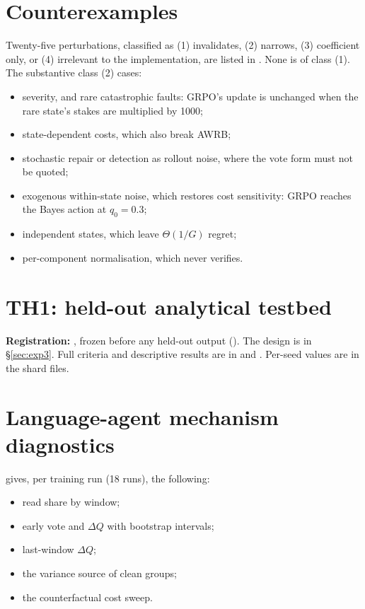 \section{Counterexamples}\label{app3:counter}
Twenty-five perturbations, classified as (1) invalidates, (2) narrows, (3) coefficient only, or (4) irrelevant to the
implementation, are listed in . None is of class (1). The substantive class (2)
cases:
\begin{itemize}
\item severity, and rare catastrophic faults: GRPO's update is unchanged when the rare state's stakes are multiplied
by 1000;
\item state-dependent costs, which also break AWRB;
\item stochastic repair or detection as rollout noise, where the vote form must not be quoted;
\item exogenous within-state noise, which restores cost sensitivity: GRPO reaches the Bayes action at $q_0=0.3$;
\item independent states, which leave $\Theta(1/G)$ regret;
\item per-component normalisation, which never verifies.
\end{itemize}

\section{TH1: held-out analytical testbed}\label{app3:th1}
\textbf{Registration:} , frozen before any held-out output
(). The design is in \S\ref{sec:exp3}. Full criteria and descriptive results are in
 and . Per-seed values are in
the shard files.

\section{Language-agent mechanism diagnostics}\label{app3:mech}
 gives, per training run (18 runs), the following:
\begin{itemize}
\item read share by window;
\item early vote and $\Delta Q$ with bootstrap intervals;
\item last-window $\Delta Q$;
\item the variance source of clean groups;
\item the counterfactual cost sweep.
\end{itemize}

